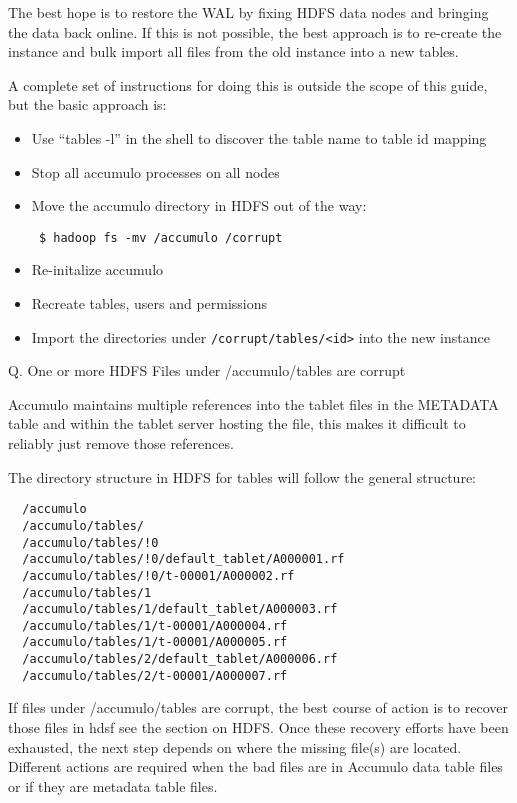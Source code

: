 The best hope is to restore the WAL by fixing HDFS data nodes and bringing the data back online.
If this is not possible, the best approach is to re-create the instance and bulk import all files from
the old instance into a new tables.

A complete set of instructions for doing this is outside the scope of this guide,
but the basic approach is:

\begin{itemize}
 \item Use ``tables -l'' in the shell to discover the table name to table id mapping
 \item Stop all accumulo processes on all nodes
 \item Move the accumulo directory in HDFS out of the way:
\begingroup\fontsize{8pt}{8pt}\selectfont\begin{verbatim}
 $ hadoop fs -mv /accumulo /corrupt
\end{verbatim}\endgroup
 \item Re-initalize accumulo
 \item Recreate tables, users and permissions
 \item Import the directories under \texttt{/corrupt/tables/<id>} into the new instance
\end{itemize}

Q. One or more HDFS Files under /accumulo/tables are corrupt

Accumulo maintains multiple references into the tablet files in the METADATA
table and within the tablet server hosting the file, this makes it difficult to
reliably just remove those references.

The directory structure in HDFS for tables will follow the general structure:

\small
\begin{verbatim}
  /accumulo
  /accumulo/tables/
  /accumulo/tables/!0
  /accumulo/tables/!0/default_tablet/A000001.rf
  /accumulo/tables/!0/t-00001/A000002.rf
  /accumulo/tables/1
  /accumulo/tables/1/default_tablet/A000003.rf
  /accumulo/tables/1/t-00001/A000004.rf
  /accumulo/tables/1/t-00001/A000005.rf
  /accumulo/tables/2/default_tablet/A000006.rf
  /accumulo/tables/2/t-00001/A000007.rf
\end{verbatim}
\normalsize

If files under /accumulo/tables are corrupt, the best course of action is to
recover those files in hdsf see the section on HDFS. Once these recovery efforts
have been exhausted, the next step depends on where the missing file(s) are
located. Different actions are required when the bad files are in Accumulo data
table files or if they are metadata table files.

